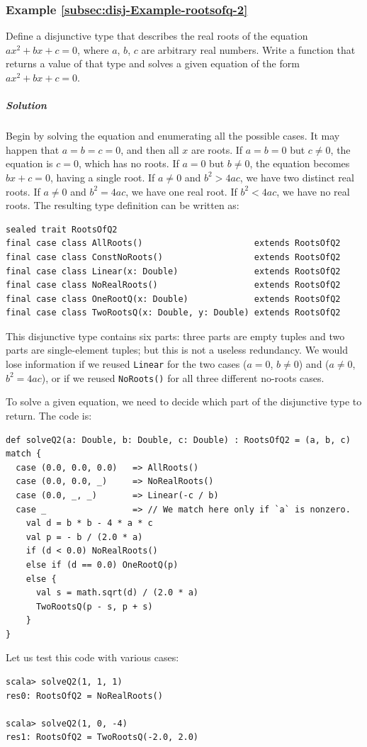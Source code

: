 \subsubsection{Example \label{subsec:disj-Example-rootsofq-2}\ref{subsec:disj-Example-rootsofq-2}}

Define a disjunctive type that describes the real roots of the equation
$ax^{2}+bx+c=0$, where $a$, $b$, $c$ are arbitrary real numbers.
Write a function that returns a value of that type and solves a given
equation of the form $ax^{2}+bx+c=0$.

\subparagraph{Solution}

Begin by solving the equation and enumerating all the possible cases.
It may happen that $a=b=c=0$, and then all $x$ are roots. If $a=b=0$
but $c\neq0$, the equation is $c=0$, which has no roots. If $a=0$
but $b\neq0$, the equation becomes $bx+c=0$, having a single root.
If $a\neq0$ and $b^{2}>4ac$, we have two distinct real roots. If
$a\neq0$ and $b^{2}=4ac$, we have one real root. If $b^{2}<4ac$,
we have no real roots. The resulting type definition can be written
as:
\begin{lstlisting}
sealed trait RootsOfQ2
final case class AllRoots()                      extends RootsOfQ2
final case class ConstNoRoots()                  extends RootsOfQ2
final case class Linear(x: Double)               extends RootsOfQ2
final case class NoRealRoots()                   extends RootsOfQ2
final case class OneRootQ(x: Double)             extends RootsOfQ2
final case class TwoRootsQ(x: Double, y: Double) extends RootsOfQ2
\end{lstlisting}
This disjunctive type contains six parts: three parts are empty tuples
and two parts are single-element tuples; but this is not a useless
redundancy. We would lose information if we reused \lstinline!Linear!
for the two cases ($a=0$, $b\neq0$) and ($a\neq0$, $b^{2}=4ac$),
or if we reused \lstinline!NoRoots()! for all three different no-roots
cases.

To solve a given equation, we need to decide which part of the disjunctive
type to return. The code is:
\begin{lstlisting}
def solveQ2(a: Double, b: Double, c: Double) : RootsOfQ2 = (a, b, c) match {
  case (0.0, 0.0, 0.0)   => AllRoots()
  case (0.0, 0.0, _)     => NoRealRoots()
  case (0.0, _, _)       => Linear(-c / b)
  case _                 => // We match here only if `a` is nonzero.
    val d = b * b - 4 * a * c
    val p = - b / (2.0 * a)
    if (d < 0.0) NoRealRoots()
    else if (d == 0.0) OneRootQ(p)
    else {
      val s = math.sqrt(d) / (2.0 * a)
      TwoRootsQ(p - s, p + s)
    }
}
\end{lstlisting}
Let us test this code with various cases:
\begin{lstlisting}
scala> solveQ2(1, 1, 1)
res0: RootsOfQ2 = NoRealRoots()

scala> solveQ2(1, 0, -4)
res1: RootsOfQ2 = TwoRootsQ(-2.0, 2.0)
\end{lstlisting}


